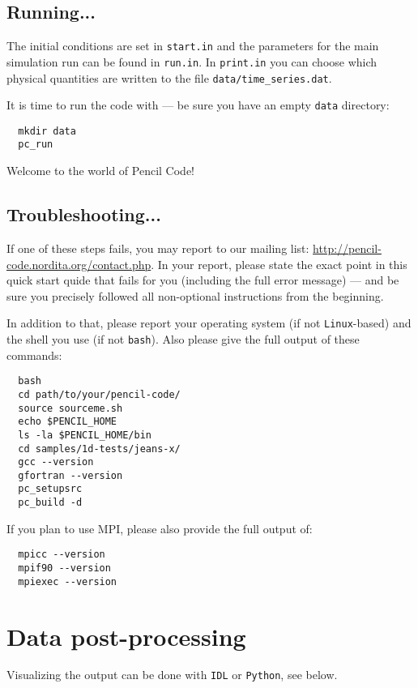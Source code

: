 \documentclass[a4paper,12pt]{article}
\begin{document}
\subsection{Running...}

The initial conditions are set in \verb|start.in| and the parameters for the main simulation run can be found in \verb|run.in|.
In \verb|print.in| you can choose which physical quantities are written to the file \verb|data/time_series.dat|.

It is time to run the code with --- be sure you have an empty \verb|data| directory:
\begin{verbatim}
  mkdir data
  pc_run
\end{verbatim}

Welcome to the world of Pencil Code!

\subsection{Troubleshooting...}

If one of these steps fails, you may report to our mailing list: \url{http://pencil-code.nordita.org/contact.php}.
In your report, please state the exact point in this quick start quide that fails for you (including the full error message) --- and be sure you precisely followed all non-optional instructions from the beginning.

In addition to that, please report your operating system (if not \verb|Linux|-based) and the shell you use (if not \verb|bash|).
Also please give the full output of these commands:
\begin{verbatim}
  bash
  cd path/to/your/pencil-code/
  source sourceme.sh
  echo $PENCIL_HOME
  ls -la $PENCIL_HOME/bin
  cd samples/1d-tests/jeans-x/
  gcc --version
  gfortran --version
  pc_setupsrc
  pc_build -d
\end{verbatim}

If you plan to use MPI, please also provide the full output of:
\begin{verbatim}
  mpicc --version
  mpif90 --version
  mpiexec --version
\end{verbatim}

\section{Data post-processing}

Visualizing the output can be done with \verb|IDL| or \verb|Python|, see below.
\end{document}
